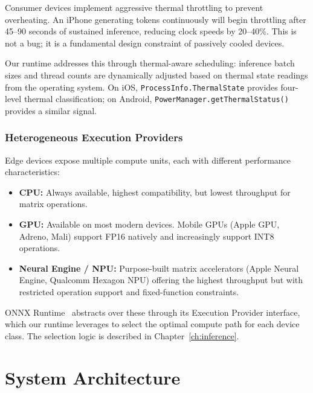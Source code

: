 \documentclass[12pt, letterpaper, twoside]{report}
\begin{document}
Consumer devices implement aggressive thermal throttling to prevent overheating. An iPhone generating tokens continuously will begin throttling after 45--90 seconds of sustained inference, reducing clock speeds by 20--40\%. This is not a bug; it is a fundamental design constraint of passively cooled devices.

Our runtime addresses this through thermal-aware scheduling: inference batch sizes and thread counts are dynamically adjusted based on thermal state readings from the operating system. On iOS, \texttt{ProcessInfo.ThermalState} provides four-level thermal classification; on Android, \texttt{PowerManager.getThermalStatus()} provides a similar signal.

\subsection{Heterogeneous Execution Providers}
\label{subsec:execution_providers}

Edge devices expose multiple compute units, each with different performance characteristics:

\begin{itemize}[itemsep=1pt, topsep=2pt, parsep=0pt]
\item \textbf{CPU:} Always available, highest compatibility, but lowest throughput for matrix operations.
\item \textbf{GPU:} Available on most modern devices. Mobile GPUs (Apple GPU, Adreno, Mali) support FP16 natively and increasingly support INT8 operations.
\item \textbf{Neural Engine / NPU:} Purpose-built matrix accelerators (Apple Neural Engine, Qualcomm Hexagon NPU) offering the highest throughput but with restricted operation support and fixed-function constraints.
\end{itemize}

ONNX Runtime~\cite{onnxruntime2019} abstracts over these through its Execution Provider interface, which our runtime leverages to select the optimal compute path for each device class. The selection logic is described in Chapter~\ref{ch:inference}.

\chapter{System Architecture}
\label{ch:architecture}
\end{document}
